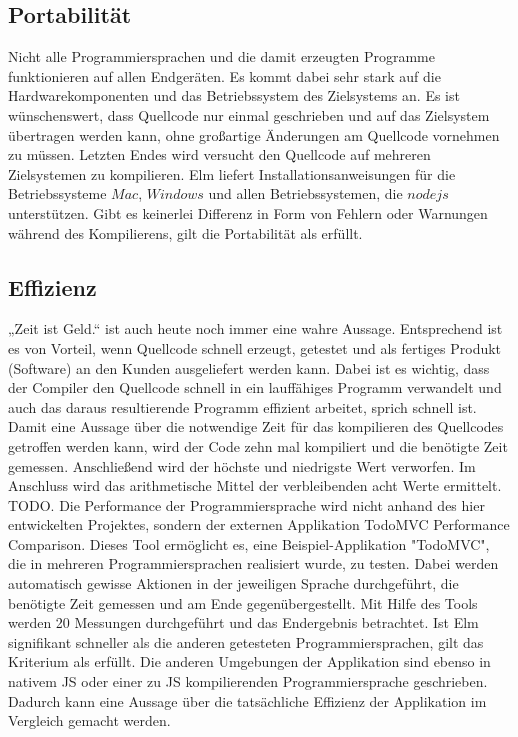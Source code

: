 \subsection{Portabilität}
\label{sec:Portabilität}
Nicht alle Programmiersprachen und die damit erzeugten Programme funktionieren auf allen Endgeräten. Es kommt dabei sehr stark auf die Hardwarekomponenten und das Betriebssystem des Zielsystems an. Es ist wünschenswert, dass Quellcode nur einmal geschrieben und auf das Zielsystem übertragen werden kann, ohne großartige Änderungen am Quellcode vornehmen zu müssen. Letzten Endes wird versucht den Quellcode auf mehreren Zielsystemen zu kompilieren. Elm liefert Installationsanweisungen für die Betriebssysteme $Mac$, $Windows$ und allen Betriebssystemen, die $nodejs$ unterstützen. Gibt es keinerlei Differenz in Form von Fehlern oder Warnungen während des Kompilierens, gilt die Portabilität als erfüllt.


\subsection{Effizienz}
\label{sec:Effizienz}
„Zeit ist Geld.“ ist auch heute noch immer eine wahre Aussage. Entsprechend ist es von Vorteil, wenn Quellcode schnell erzeugt, getestet und als fertiges Produkt (Software) an den Kunden ausgeliefert werden kann. Dabei ist es wichtig, dass der Compiler den Quellcode schnell in ein lauffähiges Programm verwandelt und auch das daraus resultierende Programm effizient arbeitet, sprich schnell ist. Damit eine Aussage über die notwendige Zeit für das kompilieren des Quellcodes getroffen werden kann, wird der Code zehn mal kompiliert und die benötigte Zeit gemessen. Anschließend wird der höchste und niedrigste Wert verworfen. Im Anschluss wird das arithmetische Mittel der verbleibenden acht Werte ermittelt. TODO.
Die Performance der Programmiersprache wird nicht anhand des hier entwickelten Projektes, sondern der externen Applikation \cite{https://github.com/evancz/todomvc-perf-comparison/} TodoMVC Performance Comparison. Dieses Tool ermöglicht es, eine Beispiel-Applikation "TodoMVC", die in mehreren Programmiersprachen realisiert wurde, zu testen. Dabei werden automatisch gewisse Aktionen in der jeweiligen Sprache durchgeführt, die benötigte Zeit gemessen und am Ende gegenübergestellt. Mit Hilfe des Tools werden 20 Messungen durchgeführt und das Endergebnis betrachtet. Ist Elm signifikant schneller als die anderen getesteten Programmiersprachen, gilt das Kriterium als erfüllt. Die anderen Umgebungen der Applikation sind ebenso in nativem \ac{JS} oder einer zu \ac{JS} kompilierenden Programmiersprache geschrieben. Dadurch kann eine Aussage über die tatsächliche Effizienz der Applikation im Vergleich gemacht werden.



